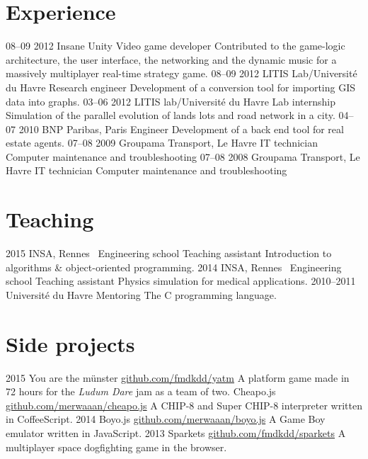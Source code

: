 \documentclass[]{friggeri-cv}
\begin{document}
\newpage

\section{Experience}

\begin{entrylist}
  \entry
    {08–09 2012}
    {Insane Unity}
    {Video game developer}
    {Contributed to the game-logic architecture, the user interface, the networking and the dynamic music for a massively multiplayer real-time strategy game.}
  \entry
    {08–09 2012}
    {LITIS Lab/Université du Havre}
    {Research engineer}
    {Development of a conversion tool for importing GIS data into graphs.}
  \entry
    {03–06 2012}
    {LITIS lab/Université du Havre}
    {Lab internship}
    {Simulation of the parallel evolution of lands lots and road network in a city.}
  \entry
    {04–07 2010}
    {BNP Paribas, Paris}
    {Engineer}
    {Development of a back end tool for real estate agents.}
  \entry
    {07–08 2009}
    {Groupama Transport, Le Havre}
    {IT technician}
    {Computer maintenance and troubleshooting}
  \entry
    {07–08 2008}
    {Groupama Transport, Le Havre}
    {IT technician}
    {Computer maintenance and troubleshooting}
\end{entrylist}

\section{Teaching}

\begin{entrylist}
  \entry
    {2015}
    {INSA, Rennes \textemdash\ Engineering school}
    {Teaching assistant}
    {Introduction to algorithms \& object-oriented programming.}
  \entry
    {2014}
    {INSA, Rennes \textemdash\ Engineering school}
    {Teaching assistant}
    {Physics simulation for medical applications.}
  \entry
    {2010–2011}
    {Université du Havre}
    {Mentoring}
    {The C programming language.}
\end{entrylist}

\section{Side projects}

\begin{entrylist}
  \entry
    {2015}
    {You are the münster}
    {\href{http://github.com/fmdkdd/yatm}{github.com/fmdkdd/yatm}}
    {A platform game made in 72 hours for the \textit{Ludum Dare} jam as a team of two.}
  \entry
    {}
    {Cheapo.js}
    {\href{http://github.com/merwaaan/cheapo.js}{github.com/merwaaan/cheapo.js}}
    {A CHIP-8 and Super CHIP-8 interpreter written in CoffeeScript.}
  \entry
    {2014}
    {Boyo.js}
    {\href{http://github.com/merwaaan/boyo.js}{github.com/merwaaan/boyo.js}}
    {A Game Boy emulator written in JavaScript.}
  \entry
    {2013}
    {Sparkets}
    {\href{http://github.com/fmdkdd/sparkets}{github.com/fmdkdd/sparkets}}
    {A multiplayer space dogfighting game in the browser.}
\end{entrylist}
\end{document}
